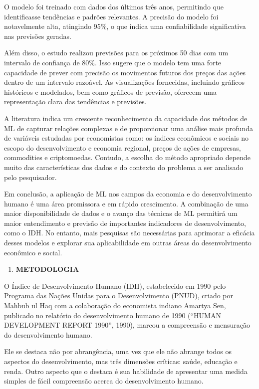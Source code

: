 \documentclass[
]{article}
\providecommand{\tightlist}{%
  \setlength{\itemsep}{0pt}\setlength{\parskip}{0pt}}
\begin{document}
O modelo foi treinado com dados dos últimos três anos, permitindo que
identificasse tendências e padrões relevantes. A precisão do modelo foi
notavelmente alta, atingindo 95\%, o que indica uma confiabilidade
significativa nas previsões geradas.

Além disso, o estudo realizou previsões para os próximos 50 dias com um
intervalo de confiança de 80\%. Isso sugere que o modelo tem uma forte
capacidade de prever com precisão os movimentos futuros dos preços das
ações dentro de um intervalo razoável. As visualizações fornecidas,
incluindo gráficos históricos e modelados, bem como gráficos de
previsão, oferecem uma representação clara das tendências e previsões.

A literatura indica um crescente reconhecimento da capacidade dos
métodos de ML de capturar relações complexas e de proporcionar uma
análise mais profunda de variáveis estudadas por economistas como: os
índices econômicos e sociais no escopo do desenvolvimento e economia
regional, preços de ações de empresas, commodities e criptomoedas.
Contudo, a escolha do método apropriado depende muito das
características dos dados e do contexto do problema a ser analisado pelo
pesquisador.

Em conclusão, a aplicação de ML nos campos da economia e do
desenvolvimento humano é uma área promissora e em rápido crescimento. A
combinação de uma maior disponibilidade de dados e o avanço das técnicas
de ML permitirá um maior entendimento e previsão de importantes
indicadores de desenvolvimento, como o IDH. No entanto, mais pesquisas
são necessárias para aprimorar a eficácia desses modelos e explorar sua
aplicabilidade em outras áreas do desenvolvimento econômico e social.

\begin{enumerate}
\def\labelenumi{\arabic{enumi}.}
\setcounter{enumi}{2}
\tightlist
\item
  \textbf{METODOLOGIA}
\end{enumerate}

O Índice de Desenvolvimento Humano (IDH), estabelecido em 1990 pelo
Programa das Nações Unidas para o Desenvolvimento (PNUD), criado por
Mahbub ul Haq com a colaboração do economista indiano Amartya Sen,
publicado no relatório do desenvolvimento humano de 1990 (``HUMAN
DEVELOPMENT REPORT 1990'', 1990), marcou a compreensão e mensuração do
desenvolvimento humano.

Ele se destaca não por abrangência, uma vez que ele não abrange todos os
aspectos do desenvolvimento, mas três dimensões críticas: saúde,
educação e renda. Outro aspecto que o destaca é sua habilidade de
apresentar uma medida simples de fácil compreensão acerca do
desenvolvimento humano.
\end{document}
